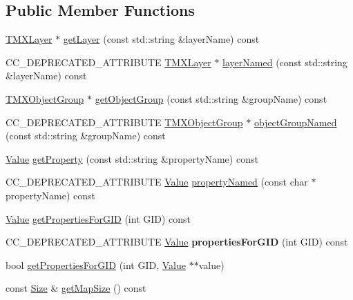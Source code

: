 \subsection*{Public Member Functions}
\begin{DoxyCompactItemize}
\item 
\hyperlink{classTMXLayer}{T\+M\+X\+Layer} $\ast$ \hyperlink{classTMXTiledMap_aff957f2716dd1f06bd8ce54b173c43e1}{get\+Layer} (const std\+::string \&layer\+Name) const
\item 
C\+C\+\_\+\+D\+E\+P\+R\+E\+C\+A\+T\+E\+D\+\_\+\+A\+T\+T\+R\+I\+B\+U\+TE \hyperlink{classTMXLayer}{T\+M\+X\+Layer} $\ast$ \hyperlink{classTMXTiledMap_a31f870242ee4c67f871f177d4ac74682}{layer\+Named} (const std\+::string \&layer\+Name) const
\item 
\hyperlink{classTMXObjectGroup}{T\+M\+X\+Object\+Group} $\ast$ \hyperlink{classTMXTiledMap_a4addb02e0b8a56ab145b3a4162b4e6b8}{get\+Object\+Group} (const std\+::string \&group\+Name) const
\item 
C\+C\+\_\+\+D\+E\+P\+R\+E\+C\+A\+T\+E\+D\+\_\+\+A\+T\+T\+R\+I\+B\+U\+TE \hyperlink{classTMXObjectGroup}{T\+M\+X\+Object\+Group} $\ast$ \hyperlink{classTMXTiledMap_a34f4aaf226d7baf1ad1e44880cf2be14}{object\+Group\+Named} (const std\+::string \&group\+Name) const
\item 
\hyperlink{classValue}{Value} \hyperlink{classTMXTiledMap_a4628b8ea7514e6f12e292b68f8e808ae}{get\+Property} (const std\+::string \&property\+Name) const
\item 
C\+C\+\_\+\+D\+E\+P\+R\+E\+C\+A\+T\+E\+D\+\_\+\+A\+T\+T\+R\+I\+B\+U\+TE \hyperlink{classValue}{Value} \hyperlink{classTMXTiledMap_a27d68f71900e3edd564ce29375c9b911}{property\+Named} (const char $\ast$property\+Name) const
\item 
\hyperlink{classValue}{Value} \hyperlink{classTMXTiledMap_a11c3215d6e74d03d30afc4c693e84d89}{get\+Properties\+For\+G\+ID} (int G\+ID) const
\item 
\mbox{\label{classTMXTiledMap_ab214ca1245f8b65f47aa3dfe41db3c41}} 
C\+C\+\_\+\+D\+E\+P\+R\+E\+C\+A\+T\+E\+D\+\_\+\+A\+T\+T\+R\+I\+B\+U\+TE \hyperlink{classValue}{Value} {\bfseries properties\+For\+G\+ID} (int G\+ID) const
\item 
bool \hyperlink{classTMXTiledMap_a1f7d99f0a15994f45a04a1607545e76e}{get\+Properties\+For\+G\+ID} (int G\+ID, \hyperlink{classValue}{Value} $\ast$$\ast$value)
\item 
const \hyperlink{classSize}{Size} \& \hyperlink{classTMXTiledMap_aacf46f135b88bbeb1f023bfc0c2b6242}{get\+Map\+Size} () const
$$
\end{DoxyCompactItemize}
